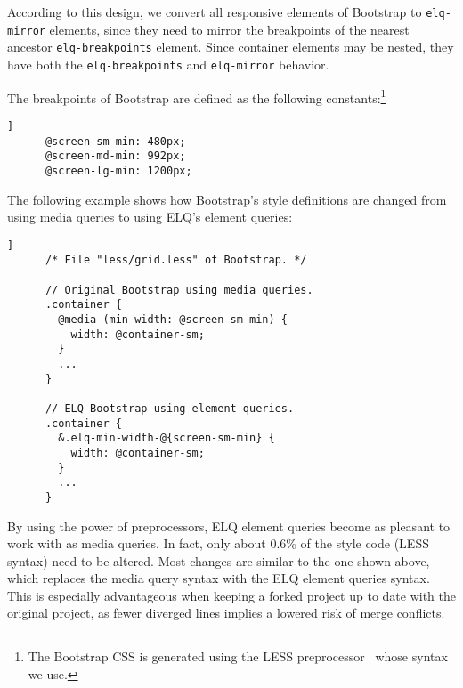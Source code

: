 \documentclass{acm_proc_article-sp}
\newcommand{\code}[1]{\texttt{#1}}
\newcommand{\elq}{ELQ}
\newcommand{\gls}[1]{#1}
\begin{document}
    According to this design, we convert all responsive elements of Bootstrap to \code{elq-mirror} elements, since they need to mirror the breakpoints of the nearest ancestor \code{elq-breakpoints} element.
    Since container elements may be nested, they have both the \code{elq-breakpoints} and \code{elq-mirror} behavior.

    The breakpoints of Bootstrap are defined as the following constants:\footnote{The Bootstrap CSS is generated using the LESS preprocessor~\cite{} whose syntax we use.}
    \begin{lstlisting}[gobble=6,label={code:bootstrap-less-breakpoints},caption={},captionpos=b]]
      @screen-sm-min: 480px;
      @screen-md-min: 992px;
      @screen-lg-min: 1200px;
    \end{lstlisting}

    The following example shows how Bootstrap's style definitions are changed from using media queries to using \elq{}'s element queries:
    \begin{lstlisting}[gobble=6,label={code:bootstrap-less-breakpoints-usage},caption={},captionpos=b]]
      /* File "less/grid.less" of Bootstrap. */

      // Original Bootstrap using media queries.
      .container {
        @media (min-width: @screen-sm-min) {
          width: @container-sm;
        }
        ...
      }

      // ELQ Bootstrap using element queries.
      .container {
        &.elq-min-width-@{screen-sm-min} {
          width: @container-sm;
        }
        ...
      }
    \end{lstlisting}

    By using the power of preprocessors, \gls{ELQ} element queries become as pleasant to work with as \gls{media queries}.
    In fact, only about 0.6\% of the style code (LESS syntax) need to be altered.
    Most changes are similar to the one shown above, which replaces the media query syntax with the \gls{ELQ} element queries syntax.
    This is especially advantageous when keeping a forked project up to date with the original project, as fewer diverged lines implies a lowered risk of merge conflicts.
\end{document}
